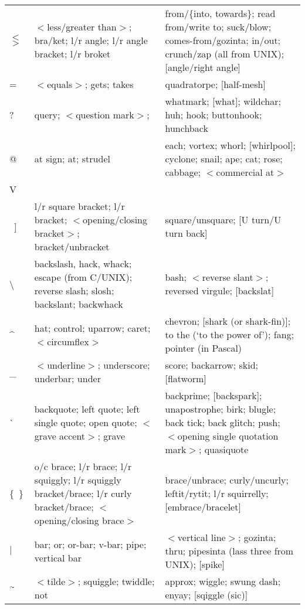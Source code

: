 \begin{onecolumn}
\begin{longtable}{>{\raggedright\arraybackslash}p{1cm}%
		>{\raggedright\arraybackslash}p{}%
		>{\raggedright\arraybackslash}p{}}
	$<$ $>$&$<$less/greater than$>$; bra/ket; l/r angle; l/r angle bracket; l/r broket&from/\{into, towards\}; read from/write to;
	suck/blow; comes-from/gozinta; in/out; crunch/zap (all from UNIX); [angle/right angle]\\
	=&$<$equals$>$; gets; takes&quadratorpe; [half-mesh]\\
	?&query; $<$question mark$>$; \citeentry{ques}&whatmark; [what]; wildchar; huh; hook; buttonhook; hunchback\\
	@&at sign; at; strudel&each; vortex; whorl; [whirlpool]; cyclone; snail; ape; cat; rose; cabbage; $<$commercial at$>$\\
	V&[book]\\
	{[}\ {]}&l/r square bracket; l/r bracket; $<$opening/closing bracket$>$; bracket/unbracket&square/unsquare; [U turn/U turn back]\\
	\textbackslash&backslash, hack, whack; escape (from C/UNIX); reverse slash; slosh; backslant; backwhack&bash; $<$reverse slant$>$;
	reversed virgule; [backslat]\\
	\^{}&hat; control; uparrow; caret; $<$circumflex$>$&chevron; [shark (or shark-fin)]; to the (`to the power of'); fang; pointer (in
	Pascal)\\
	\_&$<$underline$>$; underscore; underbar; under&score; backarrow; skid; [flatworm]\\
	\`{}&backquote; left quote; left single quote; open quote; $<$grave accent$>$; grave&backprime; [backspark]; unapostrophe; birk; blugle;
	back tick; back glitch; push; $<$opening single quotation mark$>$; quasiquote\\
	\{\ \}&o/c brace; l/r brace; l/r squiggly; l/r squiggly bracket/brace; l/r curly bracket/brace; $<$opening/closing
	brace$>$&brace/unbrace; curly/uncurly; leftit/rytit; l/r squirrelly; [embrace/bracelet]\\
	$\left|\right.$&bar; or; or-bar; v-bar; pipe; vertical bar&$<$vertical line$>$; gozinta; thru; pipesinta (lass three from UNIX);
	[spike]\\
	$\Tilde$&$<$tilde$>$; squiggle; twiddle; not&approx; wiggle; swung dash; enyay; [sqiggle (sic)]\\
	\bottomrule
\end{longtable}
\end{onecolumn}

